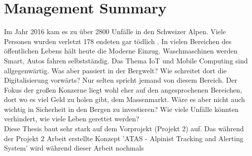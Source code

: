 \documentclass[11pt,english,german]{report}
\theoremstyle{definition}
\begin{document}
\tableofcontents











\chapter*{Management Summary}
% 
Im Jahr 2016 kam es zu über 2800 Unfälle in den Schweizer Alpen. Viele Personen wurden verletzt 178 endeten gar tödlich \cite{sacaccident}. In vielen Bereichen des öffentlichen Lebens hält heute die Moderne Einzug. Waschmaschinen werden Smart, Autos fahren selbstständig. Das Thema IoT und Mobile Computing sind allgegenwärtig. Was aber passiert in der Bergwelt? Wie schreitet dort die Digitalisierung vorwärts? Nur selten spricht jemand von diesem Bereich. Der Fokus der großen Konzerne liegt wohl eher auf den angesprochenen Bereichen, dort wo es viel Geld zu holen gibt, dem Massenmarkt. Wäre es aber nicht auch wichtig in Sicherheit in den Bergen zu investieren? Wie viele Unfälle könnten verhindert, wie viele Leben gerettet werden?\\[0.3cm]
Diese Thesis baut sehr stark auf dem Vorprojekt (Projekt 2) auf. Das während der Projekt 2 Arbeit erstellte Konzept 'ATAS - Alpinist Tracking and Alerting System' wird während dieser Arbeit nochmals  
\end{document}

